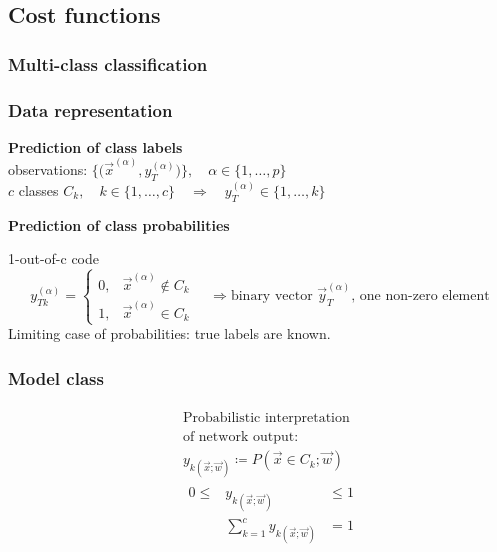 \subsection{Cost functions}

\subsubsection{Multi-class classification}

\begin{frame}\frametitle{Data representation}
	\textbf{Prediction of class labels}\\[4mm]
	observations: $\Big\{ \Big( \vec{x}^{(\alpha)}, y_T^{(\alpha)} 
		\Big) \Big\}, \quad \alpha \in  \{1, \ldots, p\}$\\
			$c$ classes $C_k, \quad k \in \{1, \ldots, c\}
		\quad\Rightarrow\quad y_T^{(\alpha)} \in \{1, \ldots, k\}$
	\vspace{8mm}
	\pause
	
	\textbf{Prediction of class probabilities}\\
	\begin{block}{1-out-of-c code}
		\begin{equation*}
			y_{Tk}^{(\alpha)} = \left 
			\{ \begin{array}{lll}
			0, & \vec{x}^{(\alpha)} \notin C_k  \\
			1, & \vec{x}^{(\alpha)} \in C_k
			\end{array} \right.
			\quad \Rightarrow 
			\text{binary vector $\vec y_T^{(\alpha)}$, one non-zero element}
		\end{equation*}
		Limiting case of probabilities: true labels are known.
	\end{block}
\end{frame}


\begin{frame}\frametitle{Model class}
	\[ \begin{array}{ll}
		\begin{array}{l}
		\end{array}
		&
		\begin{array}{l}
			\text{Probabilistic interpretation} \\
			\text{of network output:}\\[1mm]
			y_{k (\vec{x};\vec{w})} \coloneqq P(\vec{x} \in C_k; \vec{w}) \\[2mm]
			\begin{array}{lcl}
				0 \leq & y_{k (\vec{x};\vec{w})} & \leq 1 \\[1mm]
					   & \sum\limits_{k=1}^c 
					   		y_{k (\vec{x};\vec{w})} & = 1
			\end{array}
		\end{array}
	\end{array} \]
\end{frame}

